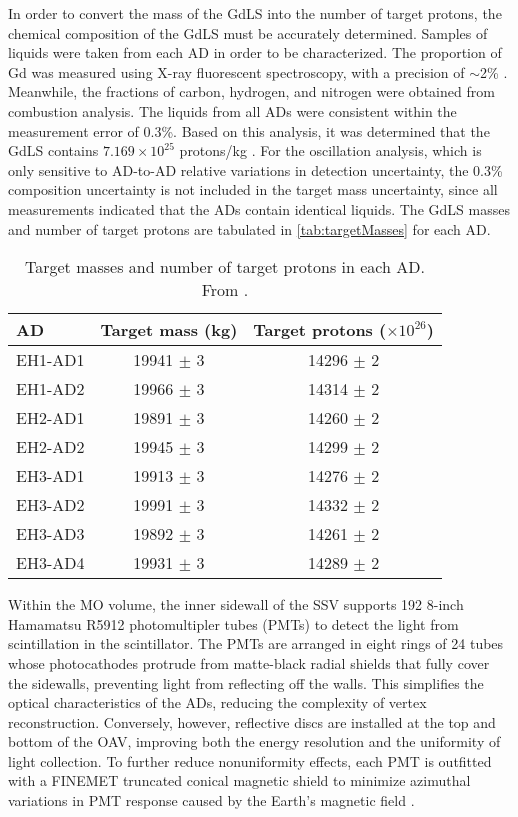 \documentclass[../thesis.tex]{subfiles}
\begin{document}
In order to convert the mass of the GdLS into the number of target protons, the chemical composition of the GdLS must be accurately determined. Samples of liquids were taken from each AD in order to be characterized. The proportion of Gd was measured using X-ray fluorescent spectroscopy, with a precision of $\sim$2\% \cite{AN2016133}. Meanwhile, the fractions of carbon, hydrogen, and nitrogen were obtained from combustion analysis. The liquids from all ADs were consistent within the measurement error of 0.3\%. Based on this analysis, it was determined that the GdLS contains $7.169 \times 10^{25}$ protons/kg \cite{Band_2013}. For the oscillation analysis, which is only sensitive to AD-to-AD relative variations in detection uncertainty, the 0.3\% composition uncertainty is not included in the target mass uncertainty, since all measurements indicated that the ADs contain identical liquids. The GdLS masses and number of target protons are tabulated in \autoref{tab:targetMasses} for each AD.

\begin{table}[h]
  \begin{tabular}{lcc}
    \toprule
    AD & Target mass (kg) & Target protons ($\times 10^{26}$) \\
    \midrule
    EH1-AD1 & 19941 $\pm$ 3 & 14296 $\pm$ 2\\
    EH1-AD2 & 19966 $\pm$ 3 & 14314 $\pm$ 2\\
    EH2-AD1 & 19891 $\pm$ 3 & 14260 $\pm$ 2\\
    EH2-AD2 & 19945 $\pm$ 3 & 14299 $\pm$ 2\\
    EH3-AD1 & 19913 $\pm$ 3 & 14276 $\pm$ 2\\
    EH3-AD2 & 19991 $\pm$ 3 & 14332 $\pm$ 2\\
    EH3-AD3 & 19892 $\pm$ 3 & 14261 $\pm$ 2\\
    EH3-AD4 & 19931 $\pm$ 3 & 14289 $\pm$ 2\\
    \bottomrule
  \end{tabular}
  \caption{Target masses and number of target protons in each AD. From \cite{An_2017}.}
  \label{tab:targetMasses}
\end{table}

Within the MO volume, the inner sidewall of the SSV supports 192 8-inch Hamamatsu R5912 photomultipler tubes (PMTs) to detect the light from scintillation in the scintillator. The PMTs are arranged in eight rings of 24 tubes whose photocathodes protrude from matte-black radial shields that fully cover the sidewalls, preventing light from reflecting off the walls. This simplifies the optical characteristics of the ADs, reducing the complexity of vertex reconstruction. Conversely, however, reflective discs are installed at the top and bottom of the OAV, improving both the energy resolution and the uniformity of light collection. To further reduce nonuniformity effects, each PMT is outfitted with a FINEMET truncated conical magnetic shield to minimize azimuthal variations in PMT response caused by the Earth's magnetic field \cite{DeVore:2013xma}.
\end{document}
